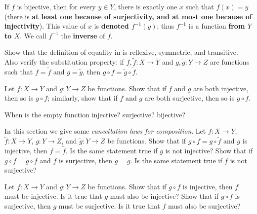 If \(f\) is bijective, then for every \(y \in Y\), there is exactly one \(x\) such that \(f(x) = y\) (there is \textbf{at least one because of surjectivity, and at most one because of injectivity}). This value of \(x\) is \textbf{denoted \(f^{-1}(y)\)}; thus \(f^{-1}\) is a function \textbf{from \(Y\) to \(X\)}. We call \(f^{-1}\) the \textbf{inverse} of \(f\).

\exercisesection

\begin{exercise} \label{exercise 3.3.1}
Show that the definition of equality in  is reflexive, symmetric, and transitive. Also verify the substitution property: if \(f, \tilde{f} : X \rightarrow Y\) and \(g, \tilde{g} : Y \rightarrow Z\) are functions such that \(f = \tilde{f}\) and \(g = \tilde{g}\), then \(g \circ f = \tilde{g} \circ \tilde{f}\).
\end{exercise}

\begin{exercise} \label{exercise 3.3.2}
Let \(f : X \rightarrow Y\) and \(g : Y \rightarrow Z\) be functions. Show that if \(f\) and \(g\) are both injective, then so is \(g \circ f\); similarly, show that if \(f\) and \(g\) are both surjective, then so is \(g \circ f\).
\end{exercise}

\begin{exercise} \label{exercise 3.3.3}
When is the empty function injective? surjective? bijective?
\end{exercise}

\begin{exercise} \label{exercise 3.3.4}
In this section we give some \emph{cancellation laws for composition}. Let \(f : X \rightarrow Y\), \(\tilde{f} : X \rightarrow Y\), \(g : Y \rightarrow Z\), and \(\tilde{g} : Y \rightarrow Z\) be functions. Show that if \(g \circ f = g \circ \tilde{f}\) and \(g\) is injective, then \(f = \tilde{f}\). Is the same statement true if \(g\) is not injective? Show that if \(g \circ f = \tilde{g} \circ f\) and \(f\) is surjective, then \(g = \tilde{g}\). Is the same statement true if \(f\) is not surjective?
\end{exercise}

\begin{exercise} \label{exercise 3.3.5}
Let \(f : X \rightarrow Y\) and \(g : Y \rightarrow Z\) be functions. Show that if \(g \circ f\) is injective, then \(f\) must be injective. Is it true that \(g\) must also be injective? Show that if \(g \circ f\) is surjective, then \(g\) must be surjective. Is it true that \(f\) must also be surjective?
\end{exercise}

